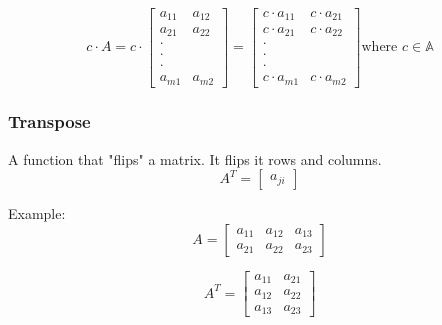 \documentclass[12pt]{report}
\begin{document}
                \begin{equation}
                c \cdot A = c \cdot
                    \begin{bmatrix} 
                    a_{11} & a_{12} \\ a_{21} & a_{22} \\ \cdot \\ \cdot \\ \cdot \\ a_{m1} & a_{m2} \end{bmatrix} =
                    \begin{bmatrix}  
                    c \cdot a_{11} & c \cdot a_{21} \\ c \cdot a_{21} & c \cdot a_{22} \\ \cdot \\ \cdot \\ \cdot \\  c \cdot a_{m1} & c \cdot a_{m2} \end{bmatrix} 
                \text{where } c \in \mathbb{A}
            \end{equation}
                
            \subsubsection{Transpose}
                A function that "flips" a matrix. It flips it rows and columns.
                \begin{equation}
                    A^T = \begin{bmatrix}
                        a_{ji}
                    \end{bmatrix}
                \end{equation}

                Example:
                \begin{equation}
                    A = \begin{bmatrix}
                        a_{11} & a_{12} & a_{13} \\
                        a_{21} & a_{22} & a_{23}
                    \end{bmatrix}
                \end{equation}

                \begin{equation}
                    A^T = \begin{bmatrix}
                        a_{11} & a_{21} \\
                        a_{12} & a_{22} \\
                        a_{13} & a_{23}
                    \end{bmatrix}
                \end{equation}
\end{document}
